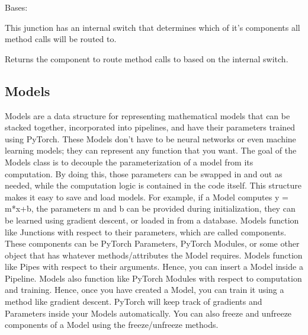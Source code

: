 \documentclass[letterpaper,10pt,english]{sphinxmanual}
\begin{document}

\begin{fulllineitems}
\label{\detokenize{Fireworks:Fireworks.toolbox.junctions.SwitchJunction}}
Bases: {\hyperref[\detokenize{Fireworks:Fireworks.core.junction.Junction}]{}}

This junction has an internal switch that determines which of it’s components all method calls will be routed to.

\begin{fulllineitems}
\label{\detokenize{Fireworks:Fireworks.toolbox.junctions.SwitchJunction.route}}
Returns the component to route method calls to based on the internal switch.

\end{fulllineitems}


\end{fulllineitems}



\subsection{Models}
\label{\detokenize{Fireworks:models}}
Models are a data structure for representing mathematical models that can be stacked together, incorporated into pipelines, and have their
parameters trained using PyTorch. These Models don’t have to be neural networks or even machine learning models; they can represent any
function that you want.
The goal of the Models class is to decouple the parameterization of a model from its computation. By doing this, those parameters can be
swapped in and out as needed, while the computation logic is contained in the code itself. This structure makes it easy to save and load models.
For example, if a Model computes y = m*x+b, the parameters m and b can be provided during initialization, they can be learned using gradient
descent, or loaded in from a database.
Models function like Junctions with respect to their parameters, which are called components. These components can be PyTorch Parameters,
PyTorch Modules, or some other object that has whatever methods/attributes the Model requires.
Models function like Pipes with respect to their arguments. Hence, you can insert a Model inside a Pipeline. Models also function like
PyTorch Modules with respect to computation and training. Hence, once you have created a Model, you can train it using a method like gradient
descent. PyTorch will keep track of gradients and Parameters inside your Models automatically. You can also freeze and unfreeze components
of a Model using the freeze/unfreeze methods.
\end{document}

